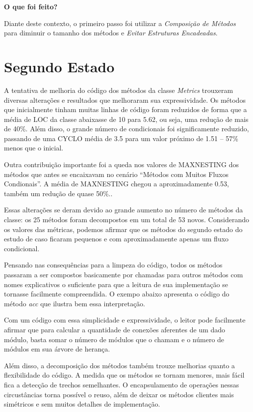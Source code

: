 \vskip 1.0cm
\textbf{O que foi feito?}

Diante deste contexto, o primeiro passo foi utilizar a \textit{Composição de Métodos} para
diminuir o tamanho dos métodos e \textit{Evitar Estruturas Encadeadas}.

\section{Segundo Estado}

A tentativa de melhoria do código dos métodos da classe \textit{Metrics}
trouxeram diversas alterações e resultados que melhoraram sua expressividade.
Os métodos que inicialmente tinham muitas linhas de código foram reduzidos de forma
que a média de LOC da classe abaixasse de 10 para 5.62, ou seja, uma redução de mais de 40\%.
Além disso, o grande número de condicionais foi significamente reduzido,
passando de uma CYCLO média de 3.5 para um valor próximo de 1.51 -- 57\% menos que o inicial.

Outra contribuição importante foi a queda nos valores de MAXNESTING dos métodos
que antes se encaixavam no cenário ``Métodos com Muitos Fluxos Condionais''. A média de
MAXNESTING chegou a aproximadamente 0.53, também um redução de quase 50\%..

Essas alterações se deram devido ao grande aumento no número de métodos da classe:
os 25 métodos foram decompostos em um total de 53 novos. Considerando os valores
das métricas, podemos afirmar que os métodos do segundo estado do estudo de caso
ficaram pequenos e com aproximadamente apenas um fluxo condicional.

Pensando nas consequências para a limpeza do código, todos os métodos passaram
a ser compostos basicamente por chamadas para outros métodos com nomes explicativos
o suficiente para que a leitura de sua implementação se tornasse facilmente compreendida.
O exempo abaixo apresenta o código do método \textit{acc} que ilustra bem essa interpretação.



Com um código com essa simplicidade e expressividade, o leitor pode facilmente
afirmar que para calcular a quantidade de conexões aferentes de um dado módulo, basta
somar o número de módulos que o chamam e o número de módulos em sua árvore de herança.

Além disso, a decomposição dos métodos também trouxe melhorias quanto a flexibilidade
do código. A medida que os métodos se tornam menores, mais fácil fica a detecção de
trechos semelhantes. O encapsulamento de operações nessas circustâncias torna possível
o reuso, além de deixar os métodos clientes mais simétricos e sem muitos detalhes de implementação.

